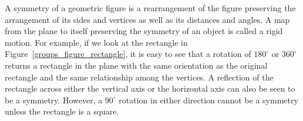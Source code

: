 A {\bfi symmetry} of a geometric figure is a rearrangement of the figure preserving the arrangement of its sides and vertices as well as its distances and angles.  A map from the plane to itself preserving the symmetry of an object is called a {\bfi rigid motion}.  For example, if we look at the rectangle in Figure~\ref{groups_figure_rectangle}, it is easy to see that a rotation of $180^{\circ}$ or $360^{\circ}$ returns a rectangle in the plane with the same orientation as the original rectangle and the same relationship among the vertices.  A reflection of the rectangle across either the vertical axis or the horizontal axis can also be seen to be a symmetry.  However, a $90^{\circ}$ rotation in either direction cannot be a symmetry unless the rectangle is a square.





